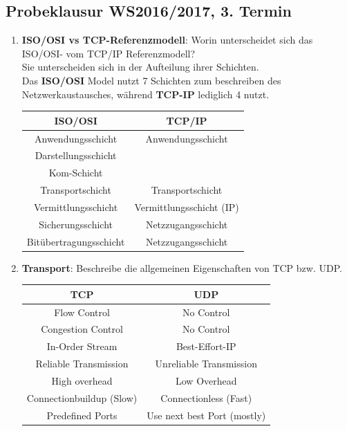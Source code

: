 \documentclass{scrartcl}
\begin{document}
    \subsection{Probeklausur WS2016/2017, 3. Termin}
    \begin{enumerate}
        \item \textbf{ISO/OSI vs TCP-Referenzmodell}: Worin unterscheidet sich das ISO/OSI- vom TCP/IP Referenzmodell?\\
        Sie unterscheiden sich in der Aufteilung ihrer Schichten.\\
        Das \textbf{ISO/OSI} Model nutzt 7 Schichten zum beschreiben des Netzwerkaustausches, während \textbf{TCP-IP} lediglich 4 nutzt.
        \begin{center}
            \begin{tabular}{c|c}
                \textbf{ISO/OSI}        & \textbf{TCP/IP}  \\\hline
                Anwendungsschicht       & Anwendungsschicht\\
                Darstellungsschicht     & \\
                Kom-Schicht             & \\
                Transportschicht        & Transportschicht\\
                Vermittlungsschicht     & Vermittlungsschicht (IP)\\
                Sicherungsschicht       & Netzzugangsschicht\\
                Bitübertragungsschicht  & Netzzugangsschicht\\
            \end{tabular}
        \end{center}
        
        \item \textbf{Transport}: Beschreibe die allgemeinen Eigenschaften von TCP bzw. UDP.\\
        
        \begin{center}
            \begin{tabular}{c|c}
                \textbf{TCP} & \textbf{UDP}                         \\\hline
                Flow Control            & No Control                \\
                Congestion Control      & No Control                \\
                In-Order Stream         & Best-Effort-IP            \\
                Reliable Transmission   & Unreliable Transmission   \\
                High overhead           & Low Overhead              \\
                Connectionbuildup (Slow)& Connectionless (Fast)     \\
                Predefined Ports        & Use next best Port (mostly)\\
            \end{tabular}
        \end{center}
        

\end{enumerate}
\end{document}
